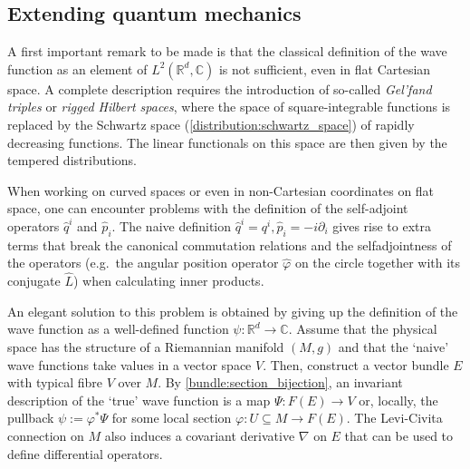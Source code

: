 \subsection{Extending quantum mechanics}

    \begin{remark}
        A first important remark to be made is that the classical definition of the wave function as an element of $L^2(\mathbb{R}^d,\mathbb{C})$ is not sufficient, even in flat Cartesian space. A complete description requires the introduction of so-called \textit{Gel'fand triples} or \textit{rigged Hilbert spaces}, where the space of square-integrable functions is replaced by the Schwartz space (\cref{distribution:schwartz_space}) of rapidly decreasing functions. The linear functionals on this space are then given by the tempered distributions.
    \end{remark}

    When working on curved spaces or even in non-Cartesian coordinates on flat space, one can encounter problems with the definition of the self-adjoint operators $\widehat{q}^i$ and $\widehat{p}_i$. The naive definition $\widehat{q}^i = q^i,\widehat{p}_i = -i\partial_i$ gives rise to extra terms that break the canonical commutation relations and the selfadjointness of the operators (e.g.~the angular position operator $\widehat{\varphi}$ on the circle together with its conjugate $\widehat{L}$) when calculating inner products.

    An elegant solution to this problem is obtained by giving up the definition of the wave function as a well-defined function $\psi:\mathbb{R}^d\rightarrow\mathbb{C}$. Assume that the physical space has the structure of a Riemannian manifold $(M,g)$ and that the `naive' wave functions take values in a vector space $V$. Then, construct a vector bundle $E$ with typical fibre $V$ over $M$. By \cref{bundle:section_bijection}, an invariant description of the `true' wave function is a map $\Psi:F(E)\rightarrow V$ or, locally, the pullback $\psi:=\varphi^*\Psi$ for some local section $\varphi:U\subseteq M\rightarrow F(E)$. The Levi-Civita connection on $M$ also induces a covariant derivative $\nabla$ on $E$ that can be used to define differential operators.

